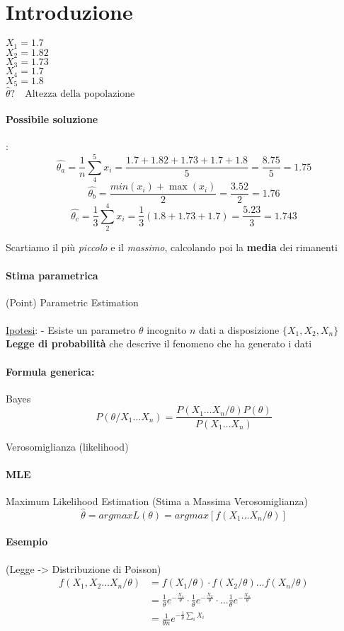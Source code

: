 \documentclass[]{article}
\newcommand{\formula}{\paragraph{Formula generica:}}
\begin{document}
    \tableofcontents
    \newpage
    
    \section{Introduzione}
    $X_1 = 1.7$ \\
    $X_2 = 1.82$ \\
    $X_3 = 1.73$\\
    $X_4 = 1.7$\\
    $X_5 = 1.8$ \\
    $\hat{\theta}? \quad \text{Altezza della popolazione}$
    \paragraph{Possibile soluzione}: 
    \[ \hat{\theta_a} = \frac{1}{n} \sum_{4}^{5} x_i = \frac{1.7 + 1.82 + 1.73 + 1.7 + 1.8}{5} = \frac{8.75}{5} = 1.75 \]
    \[ \hat{\theta_b} = \frac{min(x_i) + \max(x_i)}{2} = \frac{3.52}{2} = 1.76 \]
    \[ \hat{\theta_c} = \frac{1}{3} \sum_{2}^{4} x_i = \frac{1}{3} (1.8 + 1.73 + 1.7) = \frac{5.23}{3} = 1.743 \]
    \centerline{Scartiamo il più \textit{piccolo} e il \textit{massimo}, calcolando poi la \textbf{media} dei rimanenti}
    \paragraph{Stima parametrica}(Point) Parametric Estimation \\ \\
    \underline{Ipotesi}:
    - Esiste un parametro $\theta$ incognito $n$ dati a disposizione $\{X_1, X_2, X_n\}$ \\
    \textbf{Legge di probabilità} che descrive il fenomeno che ha generato i dati
    \formula Bayes
    \[ P(\theta / X_1 \ldots X_n) = \frac{P(X_1 \ldots X_n / \theta) P(\theta)}{P(X_1 \ldots X_n)} \]
    \centerline{Verosomiglianza (likelihood)}
    \paragraph{MLE} Maximum Likelihood Estimation (Stima a Massima Verosomiglianza)
    \[ \hat{\theta} = argmax L(\theta) = argmax[f(X_1 \ldots X_n / \theta )] \]
    \paragraph{Esempio} (Legge -> Distribuzione di Poisson)
    \begin{equation*}
        \begin{split}
            f(X_1, X_2 \ldots X_n / \theta) &= f(X_1 / \theta) \cdot f(X_2 / \theta) \ldots f(X_n / \theta) \\
            &= \frac{1}{\theta} e^{-\frac{X_1}{\theta}} \cdot \frac{1}{\theta} e^{-\frac{X_2}{\theta}} \cdot \ldots \frac{1}{\theta} e^{-\frac{X_n}{\theta}} \\
            &= \frac{1}{\theta n} e^{-\frac{1}{\theta} \sum_{i}^{} X_i }
        \end{split}
    \end{equation*}
\end{document}
